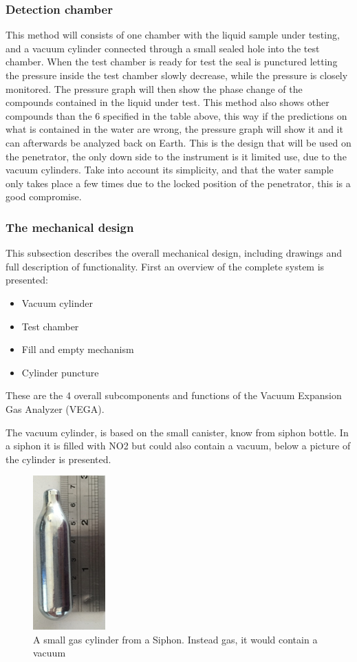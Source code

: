 \subsubsection{Detection chamber}

This method will consists of one chamber with the liquid sample under testing, and a vacuum cylinder connected through a small sealed hole into the test chamber. When the test chamber is ready for test the seal is punctured letting the pressure inside the test chamber slowly decrease, while the pressure is closely monitored. The pressure graph will then show the phase change of the compounds contained in the liquid under test. This method also shows other compounds than the 6 specified in the table above, this way if the predictions on what is contained in the water are wrong, the pressure graph will show it and it can afterwards be analyzed back on Earth. This is the design that will be used on the penetrator, the only down side to the instrument is it limited use, due to the vacuum cylinders. Take into account its simplicity, and that the water sample only takes place a few times due to the locked position of the penetrator, this is a good compromise.

\subsubsection{The mechanical design}

This subsection describes the overall mechanical design, including drawings and full description of functionality. First an overview of the complete system is presented:
\begin{itemize}
  \item Vacuum cylinder
  \item Test chamber
  \item Fill and empty mechanism
  \item Cylinder puncture
\end{itemize}
These are the 4 overall subcomponents and functions of the Vacuum Expansion Gas Analyzer (VEGA).

The vacuum cylinder, is based on the small canister, know from siphon bottle. In a siphon it is filled with NO2 but could also contain a vacuum, below a picture of the cylinder is presented.

\begin{figure}[htb]
  \centering
  \includegraphics[scale=1]{figures/GasDetectionAgge/SiphonCylinder}
  \caption{A small gas cylinder from a Siphon. Instead gas, it would contain a vacuum}
\end{figure}

